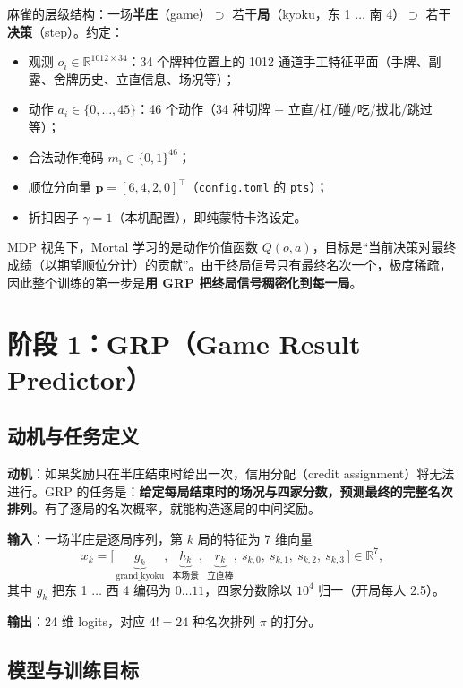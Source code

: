 \documentclass[11pt,a4paper]{ctexart}
\newcommand{\R}{\mathbb{R}}
\theoremstyle{remark}
\begin{document}
麻雀的层级结构：一场\textbf{半庄}（game）$\supset$ 若干\textbf{局}（kyoku，东 1 $\dots$ 南 4）$\supset$ 若干\textbf{决策}（step）。约定：

\begin{itemize}[leftmargin=2em]
  \item 观测 $o_i \in \R^{1012 \times 34}$：34 个牌种位置上的 1012 通道手工特征平面（手牌、副露、舍牌历史、立直信息、场况等）；
  \item 动作 $a_i \in \{0, \dots, 45\}$：46 个动作（34 种切牌 + 立直/杠/碰/吃/拔北/跳过等）；
  \item 合法动作掩码 $m_i \in \{0,1\}^{46}$；
  \item 顺位分向量 $\bm{p} = [6, 4, 2, 0]^{\top}$（\texttt{config.toml} 的 \texttt{pts}）；
  \item 折扣因子 $\gamma = 1$（本机配置），即纯蒙特卡洛设定。
\end{itemize}

MDP 视角下，Mortal 学习的是动作价值函数 $Q(o, a)$，目标是``当前决策对最终成绩（以期望顺位分计）的贡献''。由于终局信号只有最终名次一个，极度稀疏，因此整个训练的第一步是\textbf{用 GRP 把终局信号稠密化到每一局}。

\section{阶段 1：GRP（Game Result Predictor）}\label{sec:grp}

\subsection{动机与任务定义}

\textbf{动机}：如果奖励只在半庄结束时给出一次，信用分配（credit assignment）将无法进行。GRP 的任务是：\textbf{给定每局结束时的场况与四家分数，预测最终的完整名次排列}。有了逐局的名次概率，就能构造逐局的中间奖励。

\textbf{输入}：一场半庄是逐局序列，第 $k$ 局的特征为 7 维向量
\[
x_k = \big[\,\underbrace{g_k}_{\text{grand\_kyoku}},\ \underbrace{h_k}_{\text{本场景}},\ \underbrace{r_k}_{\text{立直棒}},\ s_{k,0},\ s_{k,1},\ s_{k,2},\ s_{k,3}\,\big] \in \R^{7},
\]
其中 $g_k$ 把东 1 $\dots$ 西 4 编码为 $0 \dots 11$，四家分数除以 $10^4$ 归一（开局每人 2.5）。

\textbf{输出}：24 维 logits，对应 $4! = 24$ 种名次排列 $\pi$ 的打分。

\subsection{模型与训练目标}
\end{document}
